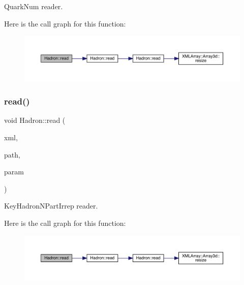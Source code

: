 Quark\+Num reader. 

Here is the call graph for this function\+:\nopagebreak
\begin{figure}[H]
\begin{center}
\leavevmode
\includegraphics[width=350pt]{d1/daf/namespaceHadron_a9fc0b61edf5216d1720dabf68810d3b5_cgraph}
\end{center}
\end{figure}
\mbox{\label{namespaceHadron_a9e39323c40f07b97b83923c9bfd452b3}} 
\subsubsection{\texorpdfstring{read()}{read()}\hspace{0.1cm}{\footnotesize\ttfamily [8/94]}}
{\footnotesize\ttfamily void Hadron\+::read (\begin{DoxyParamCaption}\item[{\mbox{\hyperlink{classADATXML_1_1XMLReader}{X\+M\+L\+Reader}} \&}]{xml,  }\item[{const std\+::string \&}]{path,  }\item[{\mbox{\hyperlink{structHadron_1_1KeyHadronNPartIrrep__t}{Key\+Hadron\+N\+Part\+Irrep\+\_\+t}} \&}]{param }\end{DoxyParamCaption})}



Key\+Hadron\+N\+Part\+Irrep reader. 

Here is the call graph for this function\+:\nopagebreak
\begin{figure}[H]
\begin{center}
\leavevmode
\includegraphics[width=350pt]{d1/daf/namespaceHadron_a9e39323c40f07b97b83923c9bfd452b3_cgraph}
\end{center}
\end{figure}
\mbox{\label{namespaceHadron_af29a7ca56e3472207899938a2a50babe}} 
